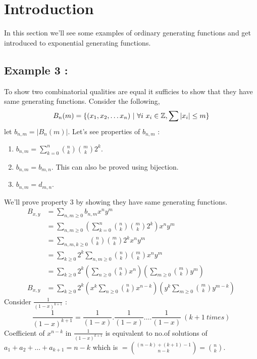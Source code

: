  


\section{Introduction}
In this section we'll see some examples of ordinary generating functions and get introduced to exponential generating functions.

\subsection{Example 3 : }
To show two combinatorial qualities are equal it sufficies to show that they have same generating functions. Consider the following,
$$ B_n(m) = \{(x_1, x_2, \dots x_n) ~|~ \forall i ~ x_i \in {\mathbb{Z}} , \sum |x_i| \leq m \}$$
let $b_{n,m} = |B_n(m)|$. Let's see properties of  $b_{n,m}$ :
\begin{enumerate}
    \item $b_{n, m} = \sum_{k=0}^n {n \choose k}{m \choose k} 2^k$.
    \item $b_{n, m} = b_{m, n}$. This can also be proved using bijection.
    \item $b_{n, m} = d_{m, n}$. 
\end{enumerate}
We'll prove property $3$ by showing they have same generating functions.
\begin{align*}
    B_{x,y} &= \sum_{n,m \geq 0} b_{n, m} x^n y^m\\
    &= \sum_{n,m \geq 0} (\sum_{k=0}^n {n \choose k}{m \choose k} 2^k) x^n y^m \\
    &= \sum_{n,m,k \geq 0}{n \choose k}{m \choose k} 2^k x^n y^m \\
    &= \sum_{k \geq 0} 2^k \sum_{n,m \geq 0} {n \choose k}{m \choose k} x^n y^m \\
    &= \sum_{k \geq 0} 2^k (\sum_{n \geq 0} {n \choose k} x^n)(\sum_{m \geq 0} {m \choose k} y^m) \\
B_{x, y}&= \sum_{k \geq 0} 2^k (x^k \sum_{n \geq 0} {n \choose k} x^{n-k})(y^k \sum_{m \geq 0} {m \choose k} y^{m-k})
\end{align*}
Consider $\frac{1}{(1-x)^{k+1}}$ : 
$$\frac{1}{(1-x)^{k+1}} = \frac{1}{(1-x)}.\frac{1}{(1-x)}. \dots \frac{1}{(1-x)} ~(k+1 ~times)$$
Coefficient of $x^{n-k}$ in $\frac{1}{(1-x)^{k+1}}$ is equivalent to no.of solutions of $a_1 + a_2 + \dots + a_{k+1} = n-k$ which is $ = {(n-k) + (k+1) -1 \choose n-k} = {n \choose k}$.
